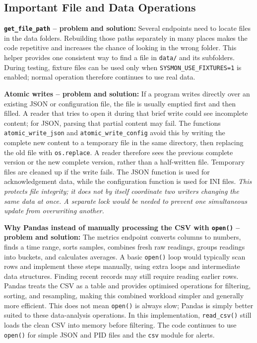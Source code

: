 \subsection{Important File and Data Operations}
\textbf{\texttt{get\_file\_path} -- problem and solution:} Several endpoints need to locate files in the data folders. Rebuilding those paths separately in many places makes the code repetitive and increases the chance of looking in the wrong folder. This helper provides one consistent way to find a file in \texttt{data/} and its subfolders. During testing, fixture files can be used only when \texttt{SYSMON\_USE\_FIXTURES=1} is enabled; normal operation therefore continues to use real data.

\textbf{Atomic writes -- problem and solution:} If a program writes directly over an existing JSON or configuration file, the file is usually emptied first and then filled. A reader that tries to open it during that brief write could see incomplete content; for JSON, parsing that partial content may fail. The functions \texttt{atomic\_write\_json} and \texttt{atomic\_write\_config} avoid this by writing the complete new content to a temporary file in the same directory, then replacing the old file with \texttt{os.replace}. A reader therefore sees the previous complete version or the new complete version, rather than a half-written file. Temporary files are cleaned up if the write fails. The JSON function is used for acknowledgement data, while the configuration function is used for INI files. \textit{This protects file integrity; it does not by itself coordinate two writers changing the same data at once. A separate lock would be needed to prevent one simultaneous update from overwriting another.}

\textbf{Why Pandas instead of manually processing the CSV with \texttt{open()} -- problem and solution:} The metrics endpoint converts columns to numbers, finds a time range, sorts samples, combines fresh raw readings, groups readings into buckets, and calculates averages. A basic \texttt{open()} loop would typically scan rows and implement these steps manually, using extra loops and intermediate data structures. Finding recent records may still require reading earlier rows. Pandas treats the CSV as a table and provides optimised operations for filtering, sorting, and resampling, making this combined workload simpler and generally more efficient. This does not mean \texttt{open()} is always slow; Pandas is simply better suited to these data-analysis operations. In this implementation, \texttt{read\_csv()} still loads the clean CSV into memory before filtering. The code continues to use \texttt{open()} for simple JSON and PID files and the \texttt{csv} module for alerts.

